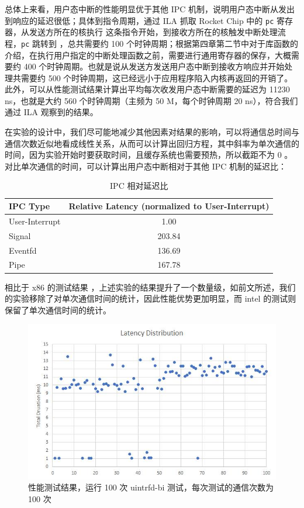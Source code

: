 总体上来看，用户态中断的性能明显优于其他 IPC 机制，说明用户态中断从发出到响应的延迟很低；具体到指令周期，通过 ILA 抓取 Rocket Chip 中的 \texttt{pc} 寄存器，从发送方所在的核执行 \Iuipisend 这条指令开始，到接收方所在的核触发中断处理流程，\texttt{pc} 跳转到 \Rutvec ，总共需要约 100 个时钟周期；根据第四章第二节中对于库函数的介绍，在执行用户指定的中断处理函数之前，需要进行通用寄存器的保存，大概需要约 400 个时钟周期。也就是说从发送方发送用户态中断到接收方响应并开始处理共需要约 500 个时钟周期，这已经远小于应用程序陷入内核再返回的开销了。此外，可以从性能测试结果计算出平均每次收发用户态中断需要的延迟为 11230 ns，也就是大约 560 个时钟周期（主频为 50 M，每个时钟周期 20 ns），符合我们通过 ILA 观察到的结果。

在实验的设计中，我们尽可能地减少其他因素对结果的影响，可以将通信总时间与通信次数近似地看成线性关系，从而可以计算出回归方程，其中斜率为单次通信的时间，因为实验开始时要获取时间，且缓存系统也需要预热，所以截距不为 0 。对比单次通信的时间，可以计算出用户态中断相对于其他 IPC 机制的延迟比：

\begin{table}
    \centering
    \begin{threeparttable}[c]
        \begin{tabular}{lc}
            \toprule
            IPC Type & Relative Latency (normalized to User-Interrupt) \\
            \midrule
            User-Interrupt & 1.00 \\
            Signal &  203.84 \\
            Eventfd & 136.69 \\
            Pipe & 167.78 \\
            \bottomrule
        \end{tabular}
        \caption{IPC 相对延迟比}
    \end{threeparttable}
    \label{tab:latency}
\end{table}

相比于 x86 的测试结果 \cite{x86uintr} ，上述实验的结果提升了一个数量级，如前文所述，我们的实验移除了对单次通信时间的统计，因此性能优势更加明显，而 intel 的测试则保留了单次通信时间的统计。

\begin{figure}
    \centering
    \includegraphics[width=0.8\linewidth]{figures/bench3.jpg}
    \caption{性能测试结果，运行 100 次 uintrfd-bi 测试，每次测试的通信次数为 100 次}
    \label{fig:deviation}
\end{figure}


